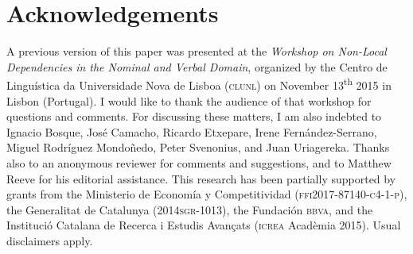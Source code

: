 \documentclass[output=paper]{langsci/langscibook}
\begin{document}
\section*{Acknowledgements}
A previous version of this paper was presented at the \textit{Workshop on Non-Local Dependencies in the Nominal and Verbal Domain}, organized by the Centro de Linguística da Universidade Nova de Lisboa (\textsc{clunl}) on November 13\textsuperscript{th} 2015 in Lisbon (Portugal). I would like to thank the audience of that workshop for questions and comments. For discussing these matters, I am also indebted to Ignacio Bosque, José Camacho, Ricardo Etxepare, Irene Fernández-Serrano, Miguel Rodríguez Mondoñedo, Peter Svenonius, and Juan Uriagereka. Thanks also to an anonymous reviewer for comments and suggestions, and to Matthew Reeve for his editorial assistance. This research has been partially supported by grants from the Ministerio de Economía y Competitividad (\textsc{ffi2017-87140-c4-1-p}), the Generalitat de Catalunya (\textsc{2014sgr-1013}), the Fundación \textsc{bbva}, and the Institució Catalana de Recerca i Estudis Avançats (\textsc{icrea} Acadèmia 2015). Usual disclaimers apply.
\end{document}
